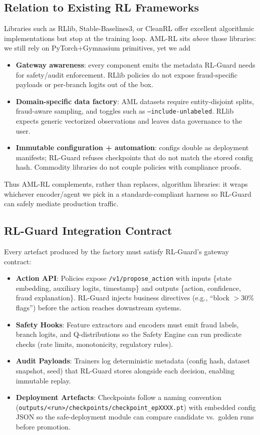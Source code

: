 \documentclass[11pt,a4paper]{article}
\begin{document}
\subsection{Relation to Existing RL Frameworks}

Libraries such as RLlib, Stable-Baselines3, or CleanRL offer excellent algorithmic implementations but stop at the training loop.\cite{ray2025rllib} AML-RL sits \emph{above} those libraries: we still rely on PyTorch+Gymnasium primitives, yet we add
\begin{itemize}
    \item \textbf{Gateway awareness}: every component emits the metadata RL-Guard needs for safety/audit enforcement. RLlib policies do not expose fraud-specific payloads or per-branch logits out of the box.
    \item \textbf{Domain-specific data factory}: AML datasets require entity-disjoint splits, fraud-aware sampling, and toggles such as \texttt{--include-unlabeled}. RLlib expects generic vectorized observations and leaves data governance to the user.
    \item \textbf{Immutable configuration + automation}: configs double as deployment manifests; RL-Guard refuses checkpoints that do not match the stored config hash. Commodity libraries do not couple policies with compliance proofs.
\end{itemize}
Thus AML-RL complements, rather than replaces, algorithm libraries: it wraps whichever encoder/agent we pick in a standards-compliant harness so RL-Guard can safely mediate production traffic.
\subsection{RL-Guard Integration Contract}

Every artefact produced by the factory must satisfy RL-Guard's gateway contract:
\begin{itemize}
    \item \textbf{Action API}: Policies expose \texttt{/v1/propose\_action} with inputs \{state embedding, auxiliary logits, timestamp\} and outputs \{action, confidence, fraud explanation\}. RL-Guard injects business directives (e.g., ``block $>$30\% flags'') before the action reaches downstream systems.
    \item \textbf{Safety Hooks}: Feature extractors and encoders must emit fraud labels, branch logits, and Q-distributions so the Safety Engine can run predicate checks (rate limits, monotonicity, regulatory rules).
    \item \textbf{Audit Payloads}: Trainers log deterministic metadata (config hash, dataset snapshot, seed) that RL-Guard stores alongside each decision, enabling immutable replay.
    \item \textbf{Deployment Artefacts}: Checkpoints follow a naming convention (\texttt{outputs/<run>/checkpoints/checkpoint\_epXXXX.pt}) with embedded config JSON so the safe-deployment module can compare candidate vs.\ golden runs before promotion.
\end{itemize}
\end{document}
